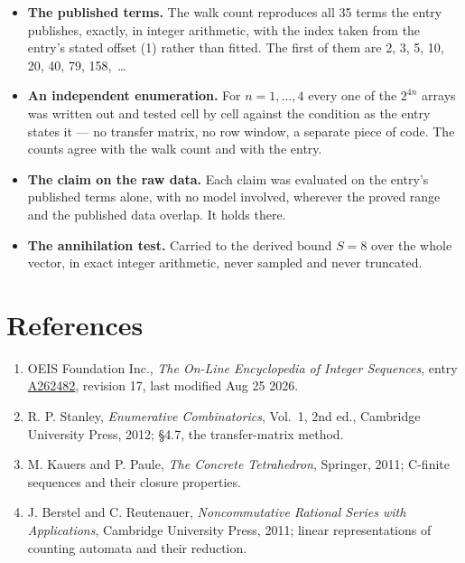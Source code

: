 \documentclass[11pt]{article}
\theoremstyle{definition}
\begin{document}
\begin{itemize}

\item {\bfseries The published terms.} The walk count reproduces all 35 terms the entry publishes, exactly, in integer arithmetic, with the index taken from the entry's stated offset (1) rather than fitted. The first of them are 2, 3, 5, 10, 20, 40, 79, 158,~\dots

\item {\bfseries An independent enumeration.} For $n = 1,\dots,4$ every one of the $2^{4n}$ arrays was written out and tested cell by cell against the condition as the entry states it --- no transfer matrix, no row window, a separate piece of code. The counts agree with the walk count and with the entry.

\item {\bfseries The claim on the raw data.} Each claim was evaluated on the entry's published terms alone, with no model involved, wherever the proved range and the published data overlap. It holds there.

\item {\bfseries The annihilation test.} Carried to the derived bound $S = 8$ over the whole vector, in exact integer arithmetic, never sampled and never truncated.

\end{itemize}

\section{References}

\begin{enumerate}

\item OEIS Foundation Inc., \emph{The On-Line Encyclopedia of Integer Sequences}, entry \href{https://oeis.org/A262482}{A262482}, revision 17, last modified Aug 25 2026.

\item R. P. Stanley, \emph{Enumerative Combinatorics}, Vol.~1, 2nd ed., Cambridge University Press, 2012; \S4.7, the transfer-matrix method.

\item M. Kauers and P. Paule, \emph{The Concrete Tetrahedron}, Springer, 2011; C-finite sequences and their closure properties.

\item J. Berstel and C. Reutenauer, \emph{Noncommutative Rational Series with Applications}, Cambridge University Press, 2011; linear representations of counting automata and their reduction.

\end{enumerate}
\end{document}
